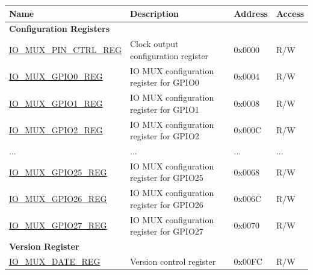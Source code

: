 \begin{longtable}{ | p{6cm} | p{7.6cm} | p{1.3cm} | p{1cm} | }
\hline\rowcolor{lightgray}
\textbf{Name} & \textbf{Description} &  \textbf{Address} & \textbf{Access} \\ \hline
\endhead

\multicolumn{4}{|l|}{\textbf{Configuration Registers}} \\ \hline

\hyperref[regdesc:IOMUXPINCTRLREG]{IO\_MUX\_PIN\_CTRL\_REG} & Clock output configuration register & 0x0000 & R/W \\ \hline

\hyperref[regdesc:IOMUXGPIONREG]{IO\_MUX\_GPIO0\_REG} & IO MUX configuration register for GPIO0 & 0x0004 & R/W \\ \hline

\hyperref[regdesc:IOMUXGPIONREG]{IO\_MUX\_GPIO1\_REG} & IO MUX configuration register for GPIO1 & 0x0008 & R/W \\ \hline

\hyperref[regdesc:IOMUXGPIONREG]{IO\_MUX\_GPIO2\_REG} & IO MUX configuration register for GPIO2 & 0x000C & R/W \\ \hline

...& ... & ... & ... \\ \hline

\hyperref[regdesc:IOMUXGPIONREG]{IO\_MUX\_GPIO25\_REG} & IO MUX configuration register for GPIO25 & 0x0068 & R/W \\ \hline

\hyperref[regdesc:IOMUXGPIONREG]{IO\_MUX\_GPIO26\_REG} & IO MUX configuration register for GPIO26 & 0x006C & R/W \\ \hline

\hyperref[regdesc:IOMUXGPIONREG]{IO\_MUX\_GPIO27\_REG} & IO MUX configuration register for GPIO27 & 0x0070 & R/W \\ \hline

\multicolumn{4}{|l|}{\textbf{Version Register}} \\ \hline
\hyperref[regdesc:IOMUXDATEREG]{IO\_MUX\_DATE\_REG} & Version control register & 0x00FC & R/W \\ \hline

\end{longtable}
